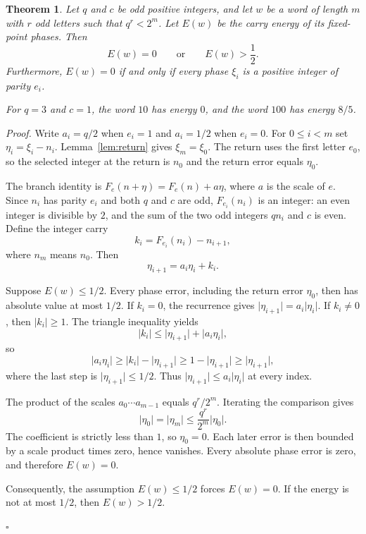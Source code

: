 \documentclass[11pt,letterpaper]{article}
\newtheorem{theorem}{Theorem}
\newenvironment{proof}{\noindent\textit{Proof.}}{\hfill\(\square\)}
\begin{document}
\begin{theorem}
\label{thm:carry-gap}
Let \(q\) and \(c\) be odd positive integers, and let \(w\) be a word of length \(m\) with \(r\) odd letters such that \(q^r<2^m\). Let \(E(w)\) be the carry energy of its fixed-point phases. Then
\[
E(w)=0\qquad\text{or}\qquad E(w)>\frac12.
\]
Furthermore, \(E(w)=0\) if and only if every phase \(\xi_i\) is a positive integer of parity \(e_i\).

For \(q=3\) and \(c=1\), the word \(10\) has energy \(0\), and the word \(100\) has energy \(8/5\).
\end{theorem}

\begin{proof}
Write \(a_i=q/2\) when \(e_i=1\) and \(a_i=1/2\) when \(e_i=0\). For \(0\le i<m\) set \(\eta_i=\xi_i-n_i\). Lemma~\ref{lem:return} gives \(\xi_m=\xi_0\). The return uses the first letter \(e_0\), so the selected integer at the return is \(n_0\) and the return error equals \(\eta_0\).

The branch identity is \(F_e(n+\eta)=F_e(n)+a\eta\), where \(a\) is the scale of \(e\). Since \(n_i\) has parity \(e_i\) and both \(q\) and \(c\) are odd, \(F_{e_i}(n_i)\) is an integer: an even integer is divisible by \(2\), and the sum of the two odd integers \(qn_i\) and \(c\) is even. Define the integer carry
\[
k_i=F_{e_i}(n_i)-n_{i+1},
\]
where \(n_m\) means \(n_0\). Then
\[
\eta_{i+1}=a_i\eta_i+k_i.
\]

Suppose \(E(w)\le 1/2\). Every phase error, including the return error \(\eta_0\), then has absolute value at most \(1/2\). If \(k_i=0\), the recurrence gives \(\lvert\eta_{i+1}\rvert=a_i\lvert\eta_i\rvert\). If \(k_i\neq 0\), then \(\lvert k_i\rvert\ge 1\). The triangle inequality yields
\[
\lvert k_i\rvert
\le\lvert\eta_{i+1}\rvert+\lvert a_i\eta_i\rvert,
\]
so
\[
\lvert a_i\eta_i\rvert
\ge\lvert k_i\rvert-\lvert\eta_{i+1}\rvert
\ge 1-\lvert\eta_{i+1}\rvert
\ge\lvert\eta_{i+1}\rvert,
\]
where the last step is \(\lvert\eta_{i+1}\rvert\le 1/2\). Thus \(\lvert\eta_{i+1}\rvert\le a_i\lvert\eta_i\rvert\) at every index.

The product of the scales \(a_0\cdots a_{m-1}\) equals \(q^r/2^m\). Iterating the comparison gives
\[
\lvert\eta_0\rvert
=\lvert\eta_m\rvert
\le\frac{q^r}{2^m}\lvert\eta_0\rvert.
\]
The coefficient is strictly less than \(1\), so \(\eta_0=0\). Each later error is then bounded by a scale product times zero, hence vanishes. Every absolute phase error is zero, and therefore \(E(w)=0\).

Consequently, the assumption \(E(w)\le 1/2\) forces \(E(w)=0\). If the energy is not at most \(1/2\), then \(E(w)>1/2\).


\end{proof}
\end{document}
